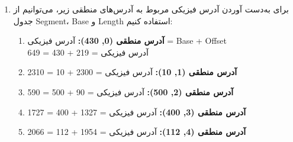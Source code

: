 \begin{qsolve}
	
	\begin{enumerate}
		\item برای به‌دست آوردن آدرس فیزیکی مربوط به آدرس‌های منطقی زیر، می‌توانیم از جدول Segment، Base و Length استفاده کنیم:
		
			\begin{enumerate}
				\item \textbf{آدرس منطقی (0, 430):}
				 آدرس فیزیکی = Base + Offset\\
				  آدرس فیزیکی = 219 + 430 = 649
			
			\item \textbf{آدرس منطقی (1, 10):}
			 آدرس فیزیکی = 2300 + 10 = 2310
			 
			 \item \textbf{آدرس منطقی (2, 500):}
			  آدرس فیزیکی = 90 + 500 = 590
			  
			  \item \textbf{آدرس منطقی (3, 400):}
			   آدرس فیزیکی = 1327 + 400 = 1727
			   
			   \item \textbf{آدرس منطقی (4, 112):}
				 آدرس فیزیکی = 1954 + 112 = 2066
			\end{enumerate}
	\end{enumerate}
\end{qsolve}


